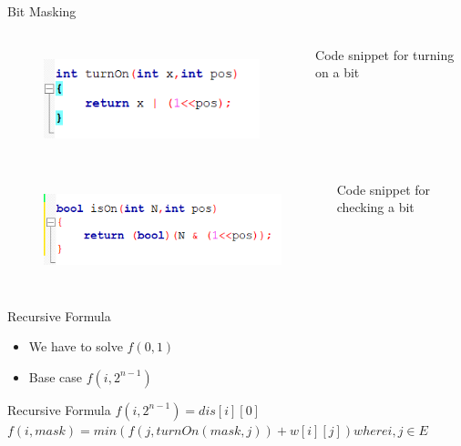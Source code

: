 \documentclass{beamer}
\begin{document}
\begin{frame}{Bit Masking}
    \begin{columns}
        \begin{figure}[h]
            \centering
            \includegraphics[scale=1]{ton.png}
            \label{fig:3}
        \end{figure}
        Code snippet for turning on a bit
    \end{columns}
    \pause
    \begin{columns}
        \begin{figure}[h]
            \centering
            \includegraphics[scale=1]{ion.png}
            \label{fig:3}
        \end{figure}
        Code snippet for checking a bit
    \end{columns}
\end{frame}
\begin{frame}{Recursive Formula}
    \begin{itemize}
        \item<1-> We have to solve $f(0,1)$
        \item<2-> Base case $f(i,2^{n-1})$
    \end{itemize}
    \pause
    \begin{block}{Recursive Formula}
            $f(i,2^{n-1}) = dis[i][0]$
            $f(i, mask) = min(f(j, turnOn(mask,j)) + w[i][j]) where i,j \in E$
    \end{block}
\end{frame}
\end{document}
